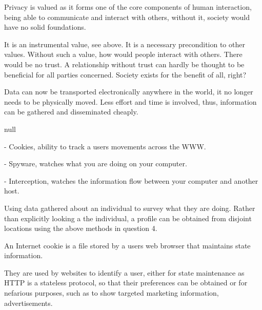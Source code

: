 
Privacy is valued as it forms one of the core components of human interaction, being able to communicate and interact with others, without it, society would have no solid foundations.

It is an instrumental value, see above. It is a necessary precondition to other values. Without such a value, how would people interact with others. There would
be no trust. A relationship without trust can hardly be thought to be beneficial for all parties concerned. Society exists for the benefit of all, right?


Data can now be transported electronically anywhere in the world, it no longer needs to be physically moved. Less effort and time is involved, thus, information can be gathered and disseminated cheaply.




null



\item - Cookies, ability to track a users movements across the WWW.
\item - Spyware, watches what you are doing on your computer.
\item - Interception, watches the information flow between your computer and another host.


Using data gathered about an individual to survey what they are doing. Rather than explicitly looking a the individual, a profile can be obtained from disjoint locations using the above methods in question 4.


An Internet cookie is a file stored by a users web browser that maintains state information.

They are used by websites to identify a user, either for state maintenance as HTTP is a stateless protocol, so that their preferences can be obtained or for nefarious purposes, such as to show targeted marketing information, advertisements.


